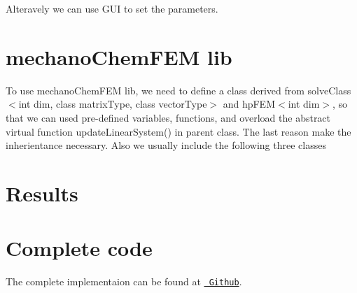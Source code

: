  Alteravely we can use G\+UI to set the parameters. \hypertarget{brain_morph_lib}{}\section{mechano\+Chem\+F\+E\+M lib}\label{brain_morph_lib}
To use mechano\+Chem\+F\+EM lib, we need to define a class derived from {\ttfamily solve\+Class$<$int dim, class matrix\+Type, class vector\+Type$>$} and {\ttfamily hp\+F\+E\+M$<$int dim$>$}, so that we can used pre-\/defined variables, functions, and overload the abstract virtual function {\ttfamily update\+Linear\+System()} in parent class. The last reason make the inherientance necessary. Also we usually include the following three classes 
\begin{DoxyCode}{0}
\end{DoxyCode}
 \hypertarget{growth_results}{}\section{Results}\label{growth_results}
    \hypertarget{brain_morph_com}{}\section{Complete code}\label{brain_morph_com}
The complete implementaion can be found at \href{https://github.com/mechanoChem/mechanoChemFEM/tree/example/brainMorph}{\texttt{ Github}}. 